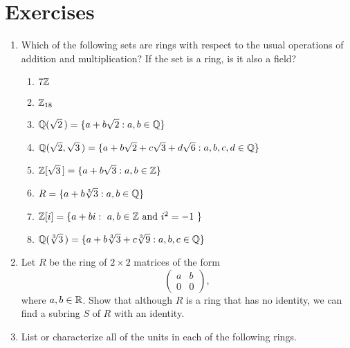 \vspace{1ex}
 
 
\section*{Exercises}
\exrule
 
 
{\small
\begin{enumerate}
 
 
\bf\item\rm
Which of the following sets are rings with respect to the usual
operations of addition and multiplication?  If the set is a ring, is
it also a field?
\begin{enumerate}
 
 \bf\item\rm
$7 {\Bbb Z}$
 
 \bf\item\rm
${\Bbb Z}_{18}$
 
 \bf\item\rm
${\Bbb Q} ( \sqrt{2}\, ) = \{a + b \sqrt{2} : a, b \in {\Bbb Q}\}$
 
 \bf\item\rm
${\Bbb Q} ( \sqrt{2}, \sqrt{3}\, ) = \{a + b \sqrt{2} + c \sqrt{3} + d
\sqrt{6} :  a, b, c, d \in {\Bbb Q}\}$
 
 \bf\item\rm
${\Bbb Z}[\sqrt{3}\, ] = \{ a + b \sqrt{3} : a, b \in {\Bbb Z} \}$
 
 \bf\item\rm
$R = \{a + b \sqrt[3]{3} : a, b \in {\Bbb Q} \}$
 
 \bf\item\rm
${\Bbb Z}[ i ] = \{ a + b i :\mbox{ $a, b \in {\Bbb Z}$ and  $i^2 =
-1$ } \}$ 
 
 \bf\item\rm
${\Bbb Q}( \sqrt[3]{3}\, ) = \{ a + b \sqrt[3]{3} + c \sqrt[3]{9} : a, b,
c \in {\Bbb Q} \}$ 
 
\end{enumerate}
 
 
\bf\item\rm
Let $R$ be the ring of $2 \times 2$ matrices of the form
\[
\left(
\begin{array}{cc}
a & b \\
0 & 0
\end{array}
\right),
\]
where $a, b \in {\Bbb R}$.  Show that although $R$ is a ring that has no
identity, we can find a subring $S$ of $R$ with an identity.
 
 
\bf\item\rm
List or characterize all of the units in each of the following rings.
\begin{enumerate}
 

\end{enumerate}
\end{enumerate}}
